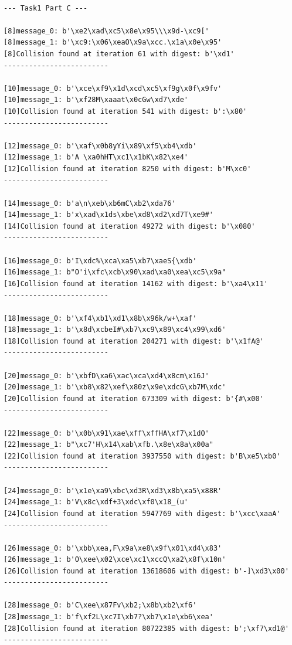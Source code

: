 \documentclass[11pt]{article}
\begin{document}
\begin{lstlisting}

--- Task1 Part C ---

[8]message_0: b'\xe2\xad\xc5\x8e\x95\\\x9d-\xc9['
[8]message_1: b'\xc9:\x06\xeaO\x9a\xcc.\x1a\x0e\x95'
[8]Collision found at iteration 61 with digest: b'\xd1'
-------------------------

[10]message_0: b'\xce\xf9\x1d\xcd\xc5\xf9g\x0f\x9fv'
[10]message_1: b'\xf28M\xaaat\x0cGw\xd7\xde'
[10]Collision found at iteration 541 with digest: b':\x80'
-------------------------

[12]message_0: b'\xaf\x0b8yYi\x89\xf5\xb4\xdb'
[12]message_1: b'A \xa0hHT\xc1\x1bK\x82\xe4'
[12]Collision found at iteration 8250 with digest: b'M\xc0'
-------------------------

[14]message_0: b'a\n\xeb\xb6mC\xb2\xda76'
[14]message_1: b'x\xad\x1ds\xbe\xd8\xd2\xd7T\xe9#'
[14]Collision found at iteration 49272 with digest: b'\x080'
-------------------------

[16]message_0: b'I\xdc%\xca\xa5\xb7\xaeS{\xdb'
[16]message_1: b"O'i\xfc\xcb\x90\xad\xa0\xea\xc5\x9a"
[16]Collision found at iteration 14162 with digest: b'\xa4\x11'
-------------------------

[18]message_0: b'\xf4\xb1\xd1\x8b\x96k/w+\xaf'
[18]message_1: b'\x8d\xcbeI#\xb7\xc9\x89\xc4\x99\xd6'
[18]Collision found at iteration 204271 with digest: b'\x1fA@'
-------------------------

[20]message_0: b'\xbfD\xa6\xac\xca\xd4\x8cm\x16J'
[20]message_1: b'\xb8\x82\xef\x80z\x9e\xdcG\xb7M\xdc'
[20]Collision found at iteration 673309 with digest: b'{#\x00'
-------------------------

[22]message_0: b'\x0b\x91\xae\xff\xffHA\xf7\x1dO'
[22]message_1: b"\xc7'H\x14\xab\xfb.\x8e\x8a\x00a"
[22]Collision found at iteration 3937550 with digest: b'B\xe5\xb0'
-------------------------

[24]message_0: b'\x1e\xa9\xbc\xd3R\xd3\x8b\xa5\x88R'
[24]message_1: b'V\x8c\xdf+3\xdc\xf0\x18_(u'
[24]Collision found at iteration 5947769 with digest: b'\xcc\xaaA'
-------------------------

[26]message_0: b'\xbb\xea,F\x9a\xe8\x9f\x01\xd4\x83'
[26]message_1: b'O\xee\x02\xce\xc1\xccQ\xa2\x8f\x10n'
[26]Collision found at iteration 13618606 with digest: b'-]\xd3\x00'
-------------------------

[28]message_0: b'C\xee\x87Fv\xb2;\x8b\xb2\xf6'
[28]message_1: b'f\xf2L\xc7I\xb7?\xb7\x1e\xb6\xea'
[28]Collision found at iteration 80722385 with digest: b';\xf7\xd1@'
-------------------------
\end{lstlisting}
\end{document}
